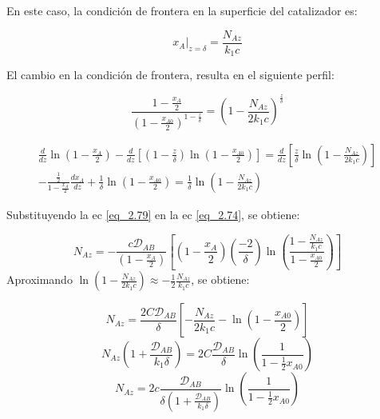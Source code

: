 En este caso, la condición de frontera en la superficie del catalizador es:

\begin{equation*}
    x_A|_{z=\delta}=\frac{N_{Az}}{k_1c}
\end{equation*}

El cambio en la condición de frontera, resulta en el siguiente perfil:

\begin{equation}
    \frac{1-\frac{x_A}{2}}{(1-\frac{x_{A0}}{2})^{1-\frac{z}{\delta}}}=\left(1-\frac{N_{Az}}{2k_1c}\right)^{\frac{z}{\delta}}
\end{equation}



\begin{equation}
\begin{split}
     \frac{d}{dz}\ln\left(1-\frac{x_A}{2}\right)-\frac{d}{dz}\left[\left(1-\frac{z}{\delta}\right)\ln\left(1-\frac{x_{A0}}{2}\right)\right]=\frac{d}{dz}\left[\frac{z}{\delta}\ln \left(1-\frac{N_{Az}}{2k_1c}\right)\right]\\-\frac{\frac{1}{2}}{1-\frac{x_A}{2}}\frac{dx_A}{dz}+\frac{1}{\delta}\ln \left(1-\frac{x_{A0}}{2}\right)=\frac{1}{\delta}\ln \left(1-\frac{N_{Az}}{2k_1c}\right)   
\end{split}
\label{eq_2.79}
\end{equation}

Substituyendo la ec \eqref{eq_2.79} en la ec \eqref{eq_2.74}, se obtiene:

\begin{equation*}
    N_{Az}=-\frac{c\mathscr{D}_{AB}}{(1-\frac{x_A}{2})}\left[\left(1-\frac{x_A}{2}\right)\left(\frac{-2}{\delta}\right)\ln \left(\frac{1-\frac{N_{Az}}{k_1c}}{1-\frac{x_{A0}}{2}}\right)\right]
\end{equation*}
Aproximando $\ln (1-\frac{N_{Az}}{2k_1c})\approx -\frac{1}{2}\frac{N_{Az}}{k_1c}$, se obtiene:

\begin{equation*}
   N_{Az}=\frac{2C\mathscr{D}_{AB}}{\delta}\left[-\frac{N_{Az}}{2k_1c}-\ln \left(1-\frac{x_{A0}}{2}\right)\right] 
\end{equation*}
\begin{equation*}
   N_{Az}\left(1+\frac{\mathscr{D}_{AB}}{k_1\delta}\right)=2C\frac{\mathscr{D}_{AB}}{\delta}\ln \left(\frac{1}{1-\frac{1}{2}x_{A0}}\right)  
\end{equation*}
\begin{equation}
   N_{Az}=2c\frac{\mathscr{D}_{AB}}{\delta(1+\frac{\mathscr{D}_{AB}}{k_1\delta})}\ln \left(\frac{1}{1-\frac{1}{2}x_{A0}}\right)  
\end{equation}

